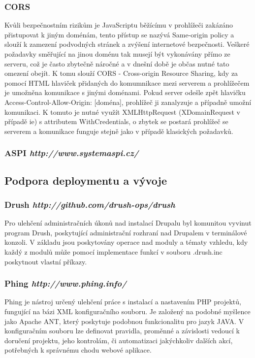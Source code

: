 \subsubsection*{CORS} 
Kvůli bezpečnostním rizikům je JavaScriptu běžícímu v prohlížeči zakázáno přistupovat k jiným doménám, tento přístup se nazývá Same-origin policy a slouží k zamezení podvodných stránek a zvýšení internetové bezpečnosti. Veškeré požadavky směřující na jinou doménu tak musejí být vykonávány přímo ze serveru, což je často zbytečně náročné a v dnešní době je občas nutné tato omezení obejít. K tomu slouží CORS - Cross-origin Resource Sharing, kdy za pomocí HTML hlaviček přidaných do komumnikace mezi serverem a prohlížečem je umožněna komunikace s jinými doménami. Pokud server odešle zpět hlavičku Access-Control-Allow-Origin: [doména], prohlížeč ji zanalyzuje a případně umožní komunikaci. K tomuto je nutné využít XMLHttpRequest (XDomainRequest v případě \gls{ie}) s attributem WithCredentials, o zbytek se postará prohlížeč se serverem a komunikace funguje stejně jako v případě klasických požadavků.

\subsubsection*{ASPI \hfill \emph{http://www.systemaspi.cz/}}

\subsection{Podpora deploymentu a vývoje}

\subsubsection*{Drush \hfill \emph{http://github.com/drush-ops/drush}}
\label{subsec:drush}
Pro ulehčení administračních úkonů nad instalací Drupalu byl komunitou vyvinut program Drush, poskytující administrační rozhraní nad Drupalem v terminálové konzoli. V základu jsou poskytovány operace nad moduly a tématy vzhledu, kdy každý z modulů může pomocí implementace funkcí v souboru .drush.inc poskytnout vlastní příkazy.

\subsubsection*{Phing \hfill \emph{http://www.phing.info/}}
\label{subsec:phing}
Phing je nástroj určený ulehčení práce s instalací a nastavením PHP projektů, fungující na bázi XML konfiguračního souboru. Je založený na podobné myšlence jako Apache ANT, který poskytuje podobnou funkcionalitu pro jazyk JAVA. V konfiguračním souboru lze definovat pravidla, proměnné a závislosti vedoucí k doručení projektu, jeho kontrolám, či automatizaci jakýchkoliv dalších akcí, potřebných k správnému chodu webové aplikace. 

